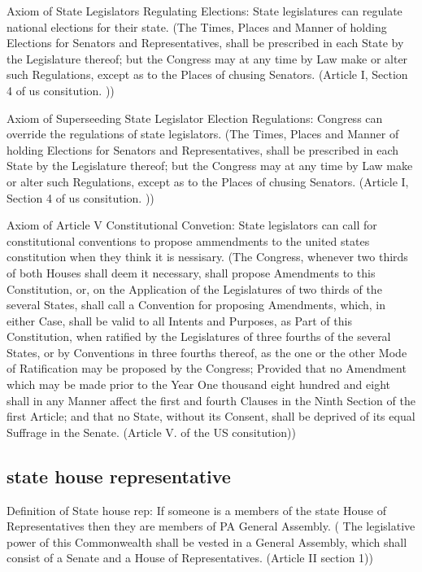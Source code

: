 \documentclass[11pt]{article} %
\begin{document}
\begin{enumerate}
Axiom of State Legislators Regulating Elections: State legislatures can regulate national elections for their state.  (The Times, Places and Manner of holding Elections for Senators and Representatives, shall be prescribed in each State by the Legislature thereof; but the Congress may at any time by Law make or alter such Regulations, except as to the Places of chusing Senators. (Article I, Section 4 of us consitution. ))

Axiom of Superseeding State Legislator Election Regulations:  Congress can override the regulations of state legislators.   (The Times, Places and Manner of holding Elections for Senators and Representatives, shall be prescribed in each State by the Legislature thereof; but the Congress may at any time by Law make or alter such Regulations, except as to the Places of chusing Senators. (Article I, Section 4 of us consitution. ))

Axiom of Article V Constitutional Convetion:  State legislators can call for constitutional conventions to propose ammendments to the united states constitution when they think it is nessisary. (The Congress, whenever two thirds of both Houses shall deem it necessary, shall propose Amendments to this Constitution, or, on the Application of the Legislatures of two thirds of the several States, shall call a Convention for proposing Amendments, which, in either Case, shall be valid to all Intents and Purposes, as Part of this Constitution, when ratified by the Legislatures of three fourths of the several States, or by Conventions in three fourths thereof, as the one or the other Mode of Ratification may be proposed by the Congress; Provided that no Amendment which may be made prior to the Year One thousand eight hundred and eight shall in any Manner affect the first and fourth Clauses in the Ninth Section of the first Article; and that no State, without its Consent, shall be deprived of its equal Suffrage in the Senate. (Article V. of the US consitution))

\subsection{state house representative}

Definition of State house rep: If someone is a members of the state House of Representatives then they are members of PA General Assembly. ( The legislative power of this Commonwealth shall be vested in a General Assembly, which shall consist of a Senate and a House of Representatives. (Article II section 1))


\end{enumerate}
\end{document}
